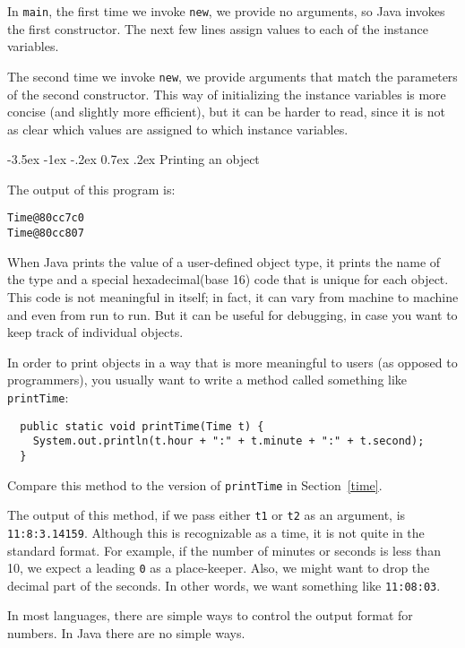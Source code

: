 \documentclass{book}
\makeatletter
\renewcommand{\section}{\@startsection 
    {section} {1} {0mm}%
    {-3.5ex \@plus -1ex \@minus -.2ex}%
    {0.7ex \@plus.2ex}%
    {\normalfont\Large\bfseries}}
\makeatother
\begin{document}
In {\tt main}, the first time we invoke {\tt new},
we provide no arguments, so Java invokes the first constructor.
The next few lines assign values to each of the instance
variables.

The second time we invoke {\tt new}, we provide
arguments that match the parameters of the second constructor.
This way of initializing the instance variables is more concise
(and slightly more efficient), but it can be harder to read, since
it is not as clear which values are assigned to which instance
variables.

\section{Printing an object}
\label{printobject}

The output of this program is:

\begin{verbatim}
Time@80cc7c0
Time@80cc807
\end{verbatim}
%
When Java prints the value of a user-defined object type, it prints
the name of the type and a special hexadecimal(base 16) code that is
unique for each object.  This code is not meaningful in itself; in
fact, it can vary from machine to machine and even from run to run.
But it can be useful for debugging, in case you want to keep track of
individual objects.

In order to print objects in a way that is more meaningful to users
(as opposed to programmers), you usually want to write a method
called something like {\tt printTime}:

\begin{verbatim}
  public static void printTime(Time t) {
    System.out.println(t.hour + ":" + t.minute + ":" + t.second);
  }
\end{verbatim}
%
Compare this method to the version of {\tt printTime} in
Section~\ref{time}.

The output of this method, if we pass either {\tt t1} or {\tt t2} as
an argument, is {\tt 11:8:3.14159}.  Although this is recognizable
as a time, it is not quite in the standard format.  For example, if
the number of minutes or seconds is less than 10, we expect a leading
{\tt 0} as a place-keeper.  Also, we might want to drop the decimal
part of the seconds.  In other words, we want something like
{\tt 11:08:03}.

In most languages, there are simple ways to control the output format
for numbers.  In Java there are no simple ways.
\end{document}
